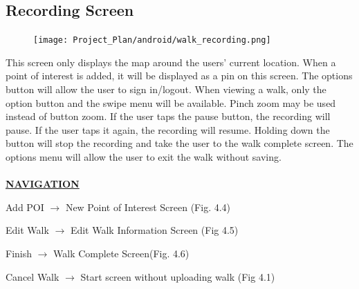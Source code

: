 \documentclass[12pt]{article}
\begin{document}
\subsection{Recording Screen}
\begin{figure}[htp]
\centering
\texttt{[image: Project\_Plan/android/walk\_recording.png]}
\caption{}
\label{}
\end{figure}
\par{This screen only displays the map around the users’ current location. When a point of interest is added, it will be displayed as a pin on this screen. The options button will allow the user to sign in/logout. When viewing a walk, only the option button and the swipe menu will be available. Pinch zoom may be used instead of button zoom. If the user taps the pause button, the recording will pause. If the user taps it again, the recording will resume. Holding down the button will stop the recording and take the user to the walk complete screen. The options menu will allow the user to exit the walk without saving. \\ \\}
\textbf{\uline{NAVIGATION}}
\par{Add POI $\rightarrow$ New Point of Interest Screen (Fig. 4.4)}
\par{Edit Walk $\rightarrow$ Edit Walk Information Screen (Fig 4.5)}
\par{Finish $\rightarrow$ Walk Complete Screen(Fig. 4.6)}
\par{Cancel Walk $\rightarrow$ Start screen without uploading walk (Fig 4.1)}
\end{document}
